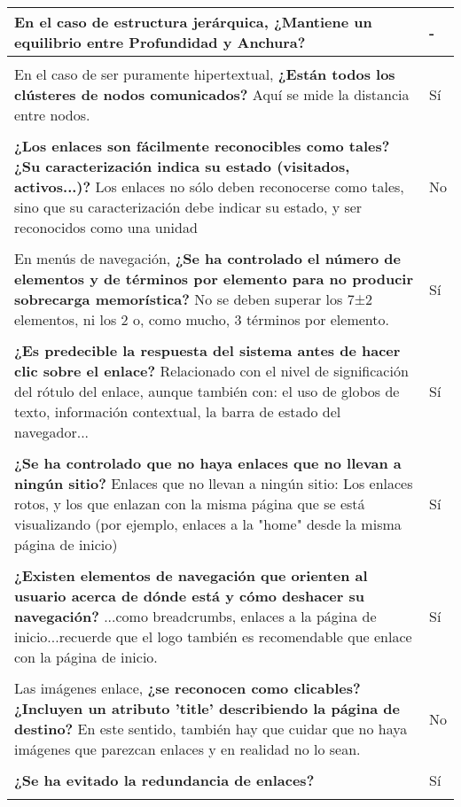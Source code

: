 \begin{longtable}[H]{p{31em}|p{5em}}
En el caso de estructura jerárquica, \textbf{¿Mantiene un equilibrio entre Profundidad y Anchura?} & - \\ \hline \\[-1em]
En el caso de ser puramente hipertextual, \textbf{¿Están todos los clústeres de nodos comunicados?} Aquí se mide la distancia entre nodos. & Sí \\ \hline \\[-1em]
\textbf{¿Los enlaces son fácilmente reconocibles como tales? ¿Su caracterización indica su estado (visitados, activos...)?} Los enlaces no sólo deben reconocerse como tales, sino que su caracterización debe indicar su estado, y ser reconocidos como una unidad  & No \\ \hline \\[-1em]
En menús de navegación, \textbf{¿Se ha controlado el número de elementos y de términos por elemento para no producir sobrecarga memorística?} No se deben superar los 7±2 elementos, ni los 2 o, como mucho, 3 términos por elemento. & Sí \\ \hline \\[-1em]
\textbf{¿Es predecible la respuesta del sistema antes de hacer clic sobre el enlace?} Relacionado con el nivel de significación del rótulo del enlace, aunque también con: el uso de globos de texto, información contextual, la barra de estado del navegador... & Sí \\ \hline \\[-1em]
\textbf{¿Se ha controlado que no haya enlaces que no llevan a ningún sitio?} Enlaces que no llevan a ningún sitio: Los enlaces rotos, y los que enlazan con la misma página que se está visualizando (por ejemplo, enlaces a la "home" desde la misma página de inicio) & Sí \\ \hline \\[-1em]
\textbf{¿Existen elementos de navegación que orienten al usuario acerca de dónde está y cómo deshacer su navegación?} ...como breadcrumbs, enlaces a la página de inicio...recuerde que el logo también es recomendable que enlace con la página de inicio. & Sí \\ \hline \\[-1em]
Las imágenes enlace, \textbf{¿se reconocen como clicables? ¿Incluyen un atributo 'title' describiendo la página de destino?} En este sentido, también hay que cuidar que no haya imágenes que parezcan enlaces y en realidad no lo sean. & No \\ \hline \\[-1em]
\textbf{¿Se ha evitado la redundancia de enlaces?} & Sí \\ \hline \\[-1em]

\end{longtable}
